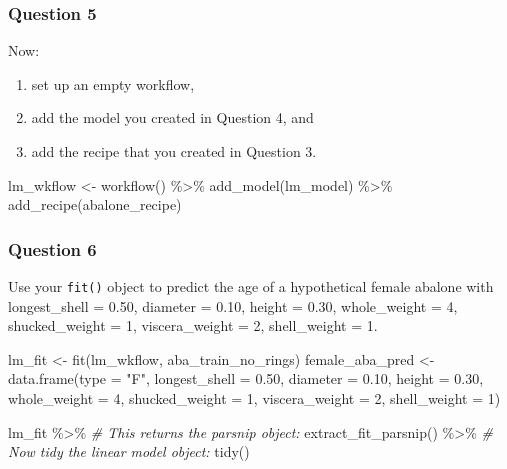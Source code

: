 \documentclass[
]{article}
\newenvironment{Shaded}{\begin{snugshade}}{\end{snugshade}}
\newcommand{\AttributeTok}[1]{\textcolor[rgb]{0.77,0.63,0.00}{#1}}
\newcommand{\CommentTok}[1]{\textcolor[rgb]{0.56,0.35,0.01}{\textit{#1}}}
\newcommand{\DecValTok}[1]{\textcolor[rgb]{0.00,0.00,0.81}{#1}}
\newcommand{\FloatTok}[1]{\textcolor[rgb]{0.00,0.00,0.81}{#1}}
\newcommand{\FunctionTok}[1]{\textcolor[rgb]{0.00,0.00,0.00}{#1}}
\newcommand{\NormalTok}[1]{#1}
\newcommand{\OtherTok}[1]{\textcolor[rgb]{0.56,0.35,0.01}{#1}}
\newcommand{\SpecialCharTok}[1]{\textcolor[rgb]{0.00,0.00,0.00}{#1}}
\newcommand{\StringTok}[1]{\textcolor[rgb]{0.31,0.60,0.02}{#1}}
\providecommand{\tightlist}{%
  \setlength{\itemsep}{0pt}\setlength{\parskip}{0pt}}
\begin{document}
\hypertarget{question-5}{%
\subsubsection{Question 5}\label{question-5}}

Now:

\begin{enumerate}
\def\labelenumi{\arabic{enumi}.}
\tightlist
\item
  set up an empty workflow,
\item
  add the model you created in Question 4, and
\item
  add the recipe that you created in Question 3.
\end{enumerate}

\begin{Shaded}
\begin{Highlighting}[]
\NormalTok{lm\_wkflow }\OtherTok{\textless{}{-}} \FunctionTok{workflow}\NormalTok{() }\SpecialCharTok{\%\textgreater{}\%}
  \FunctionTok{add\_model}\NormalTok{(lm\_model) }\SpecialCharTok{\%\textgreater{}\%}
  \FunctionTok{add\_recipe}\NormalTok{(abalone\_recipe)}
\end{Highlighting}
\end{Shaded}

\hypertarget{question-6}{%
\subsubsection{Question 6}\label{question-6}}

Use your \texttt{fit()} object to predict the age of a hypothetical
female abalone with longest\_shell = 0.50, diameter = 0.10, height =
0.30, whole\_weight = 4, shucked\_weight = 1, viscera\_weight = 2,
shell\_weight = 1.

\begin{Shaded}
\begin{Highlighting}[]
\NormalTok{lm\_fit }\OtherTok{\textless{}{-}} \FunctionTok{fit}\NormalTok{(lm\_wkflow, aba\_train\_no\_rings)}
\NormalTok{female\_aba\_pred }\OtherTok{\textless{}{-}} \FunctionTok{data.frame}\NormalTok{(}\AttributeTok{type =} \StringTok{"F"}\NormalTok{, }
                              \AttributeTok{longest\_shell =} \FloatTok{0.50}\NormalTok{, }
                              \AttributeTok{diameter =} \FloatTok{0.10}\NormalTok{, }
                              \AttributeTok{height =} \FloatTok{0.30}\NormalTok{, }
                              \AttributeTok{whole\_weight =} \DecValTok{4}\NormalTok{, }
                              \AttributeTok{shucked\_weight =} \DecValTok{1}\NormalTok{, }
                              \AttributeTok{viscera\_weight =} \DecValTok{2}\NormalTok{, }
                              \AttributeTok{shell\_weight =} \DecValTok{1}\NormalTok{)}

\NormalTok{lm\_fit }\SpecialCharTok{\%\textgreater{}\%} 
  \CommentTok{\# This returns the parsnip object:}
  \FunctionTok{extract\_fit\_parsnip}\NormalTok{() }\SpecialCharTok{\%\textgreater{}\%} 
  \CommentTok{\# Now tidy the linear model object:}
  \FunctionTok{tidy}\NormalTok{()}
\end{Highlighting}
\end{Shaded}
\end{document}
